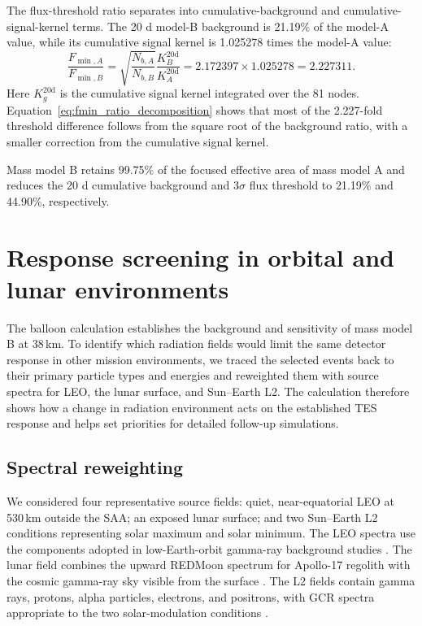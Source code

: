 \documentclass[11pt]{article}
\begin{document}
\FloatBarrier

The flux-threshold ratio separates into cumulative-background and cumulative-signal-kernel terms. The 20 d model-B background is 21.19\% of the model-A value, while its cumulative signal kernel is 1.025278 times the model-A value:
\begin{equation}
 \frac{F_{\min,A}}{F_{\min,B}}
 =\sqrt{\frac{N_{b,A}}{N_{b,B}}}\frac{K_B^{20\mathrm d}}{K_A^{20\mathrm d}}
 =2.172397\times1.025278
 =2.227311 .
 \label{eq:fmin_ratio_decomposition}
\end{equation}
Here $K_g^{20\mathrm d}$ is the cumulative signal kernel integrated over the 81 nodes. Equation~\eqref{eq:fmin_ratio_decomposition} shows that most of the 2.227-fold threshold difference follows from the square root of the background ratio, with a smaller correction from the cumulative signal kernel.

Mass model B retains 99.75\% of the focused effective area of mass model A and reduces the 20 d cumulative background and $3\sigma$ flux threshold to 21.19\% and 44.90\%, respectively.

\FloatBarrier

\section{Response screening in orbital and lunar environments}
\label{sec:environment_screening}

The balloon calculation establishes the background and sensitivity of mass
model B at 38\,km. To identify which radiation fields would limit the same
detector response in other mission environments, we traced the selected events
back to their primary particle types and energies and reweighted them with
source spectra for LEO, the lunar surface, and Sun--Earth L2. The calculation
therefore shows how a change in radiation environment acts on the established
TES response and helps set priorities for detailed follow-up simulations.

\subsection{Spectral reweighting}

We considered four representative source fields: quiet, near-equatorial LEO at
530\,km outside the SAA; an exposed lunar surface; and two Sun--Earth L2
conditions representing solar maximum and solar minimum. The LEO spectra use
the components adopted in low-Earth-orbit gamma-ray background studies
\cite{Cumani2019LEO}. The lunar field combines the upward REDMoon spectrum for
Apollo-17 regolith with the cosmic gamma-ray sky visible from the surface
\cite{Dobynde2021REDMoon}. The L2 fields contain gamma rays, protons, alpha
particles, electrons, and positrons, with GCR spectra appropriate to the two
solar-modulation conditions
\cite{Lotti2021Athena,Usoskin2005,Kuznetsov2017}.
\end{document}
